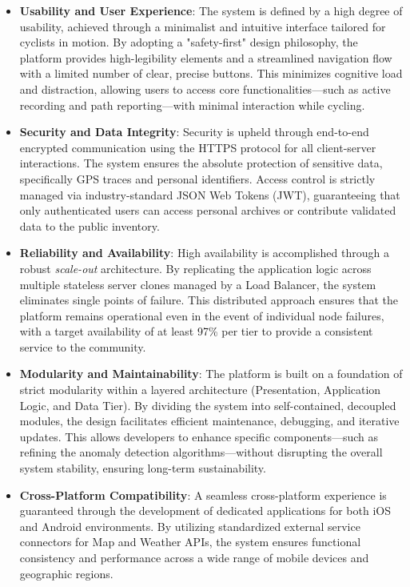 \begin{itemize}
    \item \textbf{Usability and User Experience}: The system is defined by a high degree of usability, achieved through a minimalist and intuitive interface tailored for cyclists in motion. By adopting a "safety-first" design philosophy, the platform provides high-legibility elements and a streamlined navigation flow with a limited number of clear, precise buttons. This minimizes cognitive load and distraction, allowing users to access core functionalities—such as active recording and path reporting—with minimal interaction while cycling.
    
    \item \textbf{Security and Data Integrity}: Security is upheld through end-to-end encrypted communication using the HTTPS protocol for all client-server interactions. The system ensures the absolute protection of sensitive data, specifically GPS traces and personal identifiers. Access control is strictly managed via industry-standard JSON Web Tokens (JWT), guaranteeing that only authenticated users can access personal archives or contribute validated data to the public inventory.
    
    \item \textbf{Reliability and Availability}: High availability is accomplished through a robust \textit{scale-out} architecture. By replicating the application logic across multiple stateless server clones managed by a Load Balancer, the system eliminates single points of failure. This distributed approach ensures that the platform remains operational even in the event of individual node failures, with a target availability of at least 97\% per tier to provide a consistent service to the community.
    
    \item \textbf{Modularity and Maintainability}: The platform is built on a foundation of strict modularity within a layered architecture (Presentation, Application Logic, and Data Tier). By dividing the system into self-contained, decoupled modules, the design facilitates efficient maintenance, debugging, and iterative updates. This allows developers to enhance specific components—such as refining the anomaly detection algorithms—without disrupting the overall system stability, ensuring long-term sustainability.
    
    \item \textbf{Cross-Platform Compatibility}: A seamless cross-platform experience is guaranteed through the development of dedicated applications for both iOS and Android environments. By utilizing standardized external service connectors for Map and Weather APIs, the system ensures functional consistency and performance across a wide range of mobile devices and geographic regions.
\end{itemize}